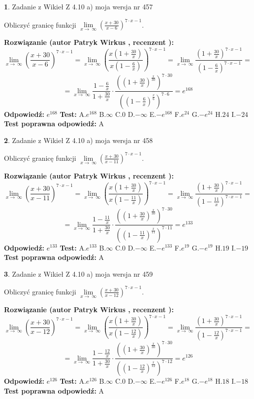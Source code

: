 \documentclass[12pt, a4paper]{article}
\theoremstyle{definition} %
\newtheorem{zad}{}
\newcommand{\zadStart}[1]{\begin{zad}#1\newline}
\newcommand{\zadStop}{\end{zad}}
\newcommand{\rozwStart}[2]{\noindent \textbf{Rozwiązanie (autor #1 , recenzent #2): }\newline}
\newcommand{\rozwStop}{\newline}
\newcommand{\odpStart}{\noindent \textbf{Odpowiedź:}\newline}
\newcommand{\odpStop}{\newline}
\newcommand{\testStart}{\noindent \textbf{Test:}\newline}
\newcommand{\testStop}{\newline}
\newcommand{\kluczStart}{\noindent \textbf{Test poprawna odpowiedź:}\newline}
\newcommand{\kluczStop}{\newline}
\begin{document}
\zadStart{Zadanie z Wikieł Z 4.10 a) moja wersja nr 457}

Obliczyć granicę funkcji  $\lim\limits_{x\to\ \infty}(\frac{x+30}{x-6})^{7\cdot x-1}$.
\zadStop
\rozwStart{Patryk Wirkus}{}
$$\lim\limits_{x\to\ \infty}(\frac{x+30}{x-6})^{7\cdot x-1} = \lim\limits_{x\to\ \infty}(\frac{x(1+\frac{30}{x})}{x(1-\frac{6}{x})})^{7\cdot x-1}=\lim\limits_{x\to\ \infty}\frac{(1+\frac{30}{x})^{7\cdot x-1}}{(1-\frac{6}{x})^{7\cdot x-1}}=$$
$$=\lim\limits_{x\to\ \infty}\frac{1-\frac{6}{x}}{1+\frac{30}{x}}\cdot\frac{((1+\frac{30}{x})^{\frac{x}{30}})^{7\cdot30}}{((1-\frac{6}{x})^{\frac{x}{6}})^{7\cdot6}}=e^{168}$$
\rozwStop
\odpStart
$e^{168}$
\odpStop
\testStart
A.$e^{168}$ B.$\infty$ C.$0$ D.$-\infty$ E.$-e^{168}$
F.$e^{24}$ G.$-e^{24}$
H.$24$
I.$-24$
\testStop
\kluczStart
A
\kluczStop



\zadStart{Zadanie z Wikieł Z 4.10 a) moja wersja nr 458}

Obliczyć granicę funkcji  $\lim\limits_{x\to\ \infty}(\frac{x+30}{x-11})^{7\cdot x-1}$.
\zadStop
\rozwStart{Patryk Wirkus}{}
$$\lim\limits_{x\to\ \infty}(\frac{x+30}{x-11})^{7\cdot x-1} = \lim\limits_{x\to\ \infty}(\frac{x(1+\frac{30}{x})}{x(1-\frac{11}{x})})^{7\cdot x-1}=\lim\limits_{x\to\ \infty}\frac{(1+\frac{30}{x})^{7\cdot x-1}}{(1-\frac{11}{x})^{7\cdot x-1}}=$$
$$=\lim\limits_{x\to\ \infty}\frac{1-\frac{11}{x}}{1+\frac{30}{x}}\cdot\frac{((1+\frac{30}{x})^{\frac{x}{30}})^{7\cdot30}}{((1-\frac{11}{x})^{\frac{x}{11}})^{7\cdot11}}=e^{133}$$
\rozwStop
\odpStart
$e^{133}$
\odpStop
\testStart
A.$e^{133}$ B.$\infty$ C.$0$ D.$-\infty$ E.$-e^{133}$
F.$e^{19}$ G.$-e^{19}$
H.$19$
I.$-19$
\testStop
\kluczStart
A
\kluczStop



\zadStart{Zadanie z Wikieł Z 4.10 a) moja wersja nr 459}

Obliczyć granicę funkcji  $\lim\limits_{x\to\ \infty}(\frac{x+30}{x-12})^{7\cdot x-1}$.
\zadStop
\rozwStart{Patryk Wirkus}{}
$$\lim\limits_{x\to\ \infty}(\frac{x+30}{x-12})^{7\cdot x-1} = \lim\limits_{x\to\ \infty}(\frac{x(1+\frac{30}{x})}{x(1-\frac{12}{x})})^{7\cdot x-1}=\lim\limits_{x\to\ \infty}\frac{(1+\frac{30}{x})^{7\cdot x-1}}{(1-\frac{12}{x})^{7\cdot x-1}}=$$
$$=\lim\limits_{x\to\ \infty}\frac{1-\frac{12}{x}}{1+\frac{30}{x}}\cdot\frac{((1+\frac{30}{x})^{\frac{x}{30}})^{7\cdot30}}{((1-\frac{12}{x})^{\frac{x}{12}})^{7\cdot12}}=e^{126}$$
\rozwStop
\odpStart
$e^{126}$
\odpStop
\testStart
A.$e^{126}$ B.$\infty$ C.$0$ D.$-\infty$ E.$-e^{126}$
F.$e^{18}$ G.$-e^{18}$
H.$18$
I.$-18$
\testStop
\kluczStart
A
\kluczStop
\end{document}
